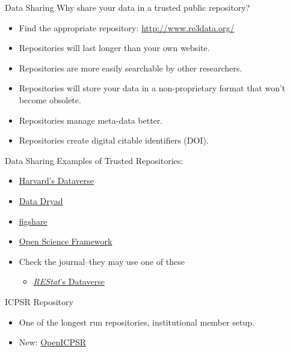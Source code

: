 \documentclass{beamer}
\begin{document}

\begin{frame}{Data Sharing}
Why share your data in a trusted public repository?
\begin{itemize}[<.->]
\item
Find the appropriate repository: \url{http://www.re3data.org/}
\item
Repositories will last longer than your own website.
\item
Repositories are more easily searchable by other researchers.
\item
Repositories will store your data in a non-proprietary format that won't become obsolete.
\item 
Repositories manage meta-data better.
\item
Repositories create digital citable identifiers (DOI).

\end{itemize}
\end{frame}

\begin{frame}{Data Sharing}
Examples of Trusted Repositories:
\begin{itemize}
\item \href{http://dataverse.harvard.edu}{Harvard's Dataverse}
\item \href{http://datadryad.org/}{Data Dryad}
\item \href{http://figshare.com}{figshare}
\item \href{http://osf.io}{Open Science Framework}
\item Check the journal--they may use one of these
\begin{itemize}
\item \href{https://dataverse.harvard.edu/dataverse/restat}{\textit{REStat}'s Dataverse}
\end{itemize}
\end{itemize}
\end{frame}

\begin{frame}{ICPSR Repository}
\begin{itemize}
\item
One of the longest run repositories, institutional member setup.
\item
New: \href{https://www.openicpsr.org/}{OpenICPSR} 

\end{itemize}
\end{frame}

\end{document}
